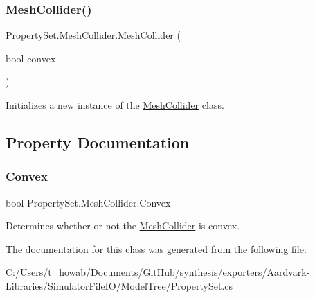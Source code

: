 \subsubsection{\texorpdfstring{Mesh\+Collider()}{MeshCollider()}}
{\footnotesize\ttfamily Property\+Set.\+Mesh\+Collider.\+Mesh\+Collider (\begin{DoxyParamCaption}\item[{bool}]{convex }\end{DoxyParamCaption})}



Initializes a new instance of the \hyperlink{class_property_set_1_1_mesh_collider}{Mesh\+Collider} class. 



\subsection{Property Documentation}
\mbox{\label{class_property_set_1_1_mesh_collider_a4888f42e196344977eae58654dddf265}} 
\subsubsection{\texorpdfstring{Convex}{Convex}}
{\footnotesize\ttfamily bool Property\+Set.\+Mesh\+Collider.\+Convex\hspace{0.3cm}{\ttfamily [get]}}



Determines whether or not the \hyperlink{class_property_set_1_1_mesh_collider}{Mesh\+Collider} is convex. 



The documentation for this class was generated from the following file\+:\begin{DoxyCompactItemize}
\item 
C\+:/\+Users/t\+\_\+howab/\+Documents/\+Git\+Hub/synthesis/exporters/\+Aardvark-\/\+Libraries/\+Simulator\+File\+I\+O/\+Model\+Tree/Property\+Set.\+cs\end{DoxyCompactItemize}
